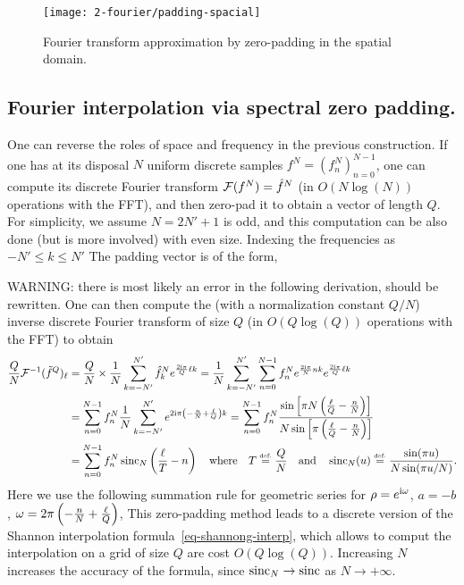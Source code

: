 \begin{figure}
\centering
\texttt{[image: 2-fourier/padding-spacial]}
\caption{\label{fig-padding-spacial}
Fourier transform approximation by zero-padding in the spatial domain.
}
\end{figure}


\subsection{Fourier interpolation via spectral zero padding.}

One can reverse the roles of space and frequency in the previous construction. 
%
If one has at its disposal $N$ uniform discrete samples $f^N=(f^N_n)_{n=0}^{N-1}$, one can compute its discrete Fourier transform $\mathcal{F}(f^N) = \hat f^N$ (in $O(N \log(N))$ operations with the FFT), 
and then zero-pad it to obtain a vector of length $Q$.
%
For simplicity, we assume $N=2N'+1$ is odd, and this computation can be also done (but is more involved) with even size.
%
Indexing the frequencies as $-N' \leq k \leq N'$ The padding vector is of the form, 

WARNING: there is most likely an error in the following derivation, should be rewritten.
One can then compute the (with a normalization constant $Q/N$) inverse discrete Fourier transform of size $Q$ (in $O(Q \log(Q))$ operations with the FFT) to obtain
\begin{align*}
	\frac{Q}{N} \mathcal{F}^{-1}( \tilde f^Q )_\ell &= 
	\frac{Q}{N} \times \frac{1}{N} \sum_{k=-N'}^{N'} \hat f_k^N e^{ \frac{2\mathrm{i}\pi}{Q} \ell k } 
	= \frac{1}{N} \sum_{k=-N'}^{N'} \sum_{n=0}^{N-1} f^N_n e^{\frac{2\mathrm{i}\pi}{N} n k} e^{ \frac{2\mathrm{i}\pi}{Q} \ell k }  \\
	&= \sum_{n=0}^{N-1} f^N_n \frac{1}{N} \sum_{k=-N'}^{N'} e^{ 2\mathrm{i}\pi \left(  -\frac{n}{N} + \frac{\ell}{Q}  \right) k } 
	=  \sum_{n=0}^{N-1} f^N_n 
			\frac{ 
				\sin\left[ \pi N \left(  \frac{\ell}{Q} - \frac{n}{N}  \right) \right]  
			}{
				N \sin\left[ \pi \left(  \frac{\ell}{Q} - \frac{n}{N}  \right) \right]
			}  \\
	&= \sum_{n=0}^{N-1} f^N_n \operatorname{sinc}_N\left(  \frac{\ell}{T} - n  \right)
	\quad \text{where} \quad
	T \stackrel{\mbox{\upshape\tiny def.}}{=} \frac{Q}{N} \quad \text{and} \quad \operatorname{sinc}_N(u) \stackrel{\mbox{\upshape\tiny def.}}{=} \frac{ \sin(\pi u) }{ N \sin(\pi u /N) }.
\end{align*}
Here we use the following summation rule for geometric series for $\rho=e^{\mathrm{i} \omega}$, $a=-b$, $\omega = 2\pi \left(  -\frac{n}{N} + \frac{\ell}{Q}  \right)$, 
This zero-padding method leads to a discrete version of the Shannon interpolation formula~\eqref{eq-shannong-interp}, which allows to comput the interpolation on a grid of size $Q$ are cost $O(Q\log(Q))$. Increasing $N$ increases the accuracy of the formula, since $\operatorname{sinc}_N \rightarrow \operatorname{sinc}$ as $N \rightarrow +\infty$.

